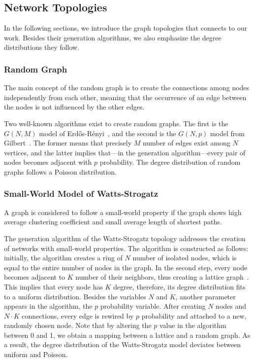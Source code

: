 \subsection{Network Topologies} \label{sec:topologies}

In the following sections, we introduce the graph topologies that connects to our work. Besides their generation algorithms, we also emphasize the degree distributions they follow.

\subsubsection{Random Graph}

The main concept of the random graph is to create the connections among nodes independently from each other, meaning that the occurrence of an edge between the nodes is not influenced by the other edges. 

Two well-known algorithms exist to create random graphs. The first is the $G(N, M)$ model of Erdős-Rényi~\cite{erdos_random}, and the second is the $G(N,p)$ model from Gilbert~\cite{gilbert_random}. The former means that precisely $M$ number of edges exist among $N$ vertices, and the latter implies that---in the generation algorithm---every pair of nodes becomes adjacent with $p$ probability. The degree distribution of random graphs follows a Poisson distribution.

\subsubsection{Small-World Model of Watts-Strogatz}

A graph is considered to follow a small-world property if the graph shows high average clustering coefficient and small average length of shortest paths.

The generation algorithm of the Watts-Strogatz topology addresses the creation of networks with small-world properties. The algorithm is constructed as follows: initially, the algorithm creates a ring of $N$ number of isolated nodes, which is equal to the entire number of nodes in the graph. In the second step, every node becomes adjacent to $K$ number of their neighbors, thus creating a lattice graph~\cite{lattice}. This implies that every node has $K$ degree, therefore, its degree distribution fits to a uniform distribution. Besides the variables $N$ and $K$, another parameter appears in the algorithm, the $p$ probability variable. After creating $N$ nodes and $N \cdot K$ connections, every edge is rewired by $p$ probability and attached to a new, randomly chosen node. Note that by altering the $p$ value in the algorithm between 0 and 1, we obtain a mapping between a lattice and a random graph. As a result, the degree distribution of the Watts-Strogatz model deviates between uniform and Poisson.

